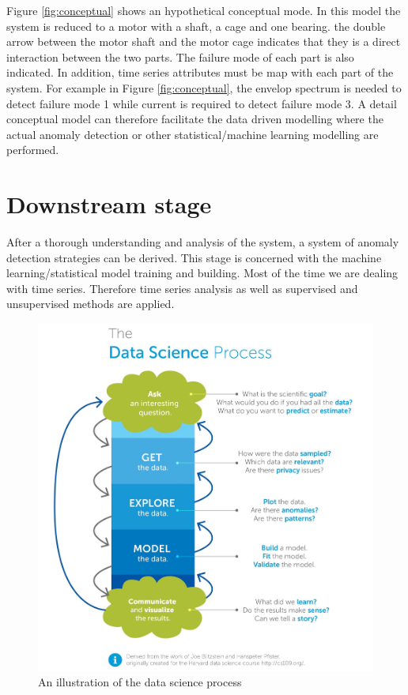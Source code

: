 \documentclass[11pt, oneside]{article}   	%
\begin{document}
\justify
Figure \ref{fig:conceptual} shows an hypothetical conceptual mode. In this model the system is reduced to a motor with a shaft, a cage and one bearing. the double arrow between the motor shaft and the motor cage indicates that they is a direct interaction between the two parts. The failure mode of each part is also indicated.
\justify
In addition, time series attributes must be map with each part of the system. For example in Figure \ref{fig:conceptual}, the envelop spectrum is needed to detect failure mode 1 while current is required to detect failure mode 3. A detail conceptual model can therefore facilitate the data driven modelling where the actual anomaly detection or other statistical/machine learning modelling are performed.
\clearpage
\section{Downstream stage}
After a thorough understanding and analysis of the system, a system of anomaly detection strategies can be derived. This stage is concerned with the machine learning/statistical model training and building. Most of the time we are dealing with time series. Therefore time series analysis as well as supervised and unsupervised methods are applied.
\begin{figure}[H] %
   \centering
   \includegraphics[width=5in]{dprocess.jpeg} 
   \caption{An illustration of the data science process}
   \label{fig:dp}
\end{figure}
\end{document}

